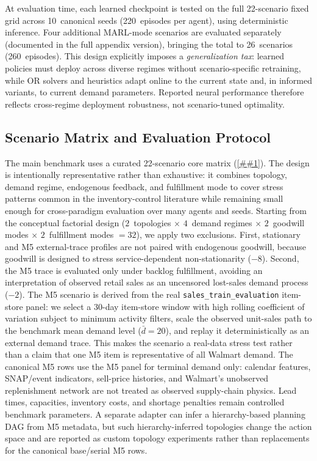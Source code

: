 \documentclass[10pt,a4paper]{article}
\providecommand{\Cref}[1]{\ref{##1}}
\begin{document}
At evaluation time, each learned checkpoint is tested on the full
22-scenario fixed grid across 10~canonical seeds (220~episodes per
agent), using deterministic inference. Four additional MARL-mode
scenarios are evaluated separately (documented in the full appendix
version), bringing the total to 26~scenarios (260~episodes). This design
explicitly imposes a \emph{generalization tax}: learned policies must
deploy across diverse regimes without scenario-specific retraining,
while OR solvers and heuristics adapt online to the current state and,
in informed variants, to current demand parameters. Reported neural
performance therefore reflects cross-regime deployment robustness, not
scenario-tuned optimality.

\subsection{Scenario Matrix and Evaluation Protocol}

The main benchmark uses a curated 22-scenario core matrix
(\Cref{tab:scenario_axes}). The design is intentionally representative
rather than exhaustive: it combines topology, demand regime, endogenous
feedback, and fulfillment mode to cover stress patterns common in the
inventory-control literature while remaining small enough for
cross-paradigm evaluation over many agents and seeds. Starting from the
conceptual factorial design
($2$~topologies $\times$ $4$~demand regimes $\times$ $2$~goodwill modes
$\times$ $2$~fulfillment modes $=32$), we apply two exclusions. First,
stationary and M5 external-trace profiles are not paired with endogenous
goodwill, because goodwill is designed to stress service-dependent
non-stationarity ($-8$). Second, the M5 trace is evaluated only under
backlog fulfillment, avoiding an interpretation of observed retail
sales as an uncensored lost-sales demand process ($-2$).
The M5 scenario is derived from the real \texttt{sales\_train\_evaluation}
item-store panel: we select a 30-day item-store window with high rolling
coefficient of variation subject to minimum activity filters, scale the
observed unit-sales path to the benchmark mean demand level
($\bar d=20$), and replay it deterministically as an external demand
trace. This makes the scenario a real-data stress test rather than a
claim that one M5 item is representative of all Walmart demand. The
canonical M5 rows use the M5 panel for terminal demand only: calendar
features, SNAP/event indicators, sell-price histories, and Walmart's
unobserved replenishment network are not treated as observed supply-chain
physics. Lead times, capacities, inventory costs, and shortage penalties
remain controlled benchmark parameters. A separate adapter can infer a
hierarchy-based planning DAG from M5 metadata, but such hierarchy-inferred
topologies change the action space and are reported as custom topology
experiments rather than replacements for the canonical base/serial M5 rows.
\end{document}
